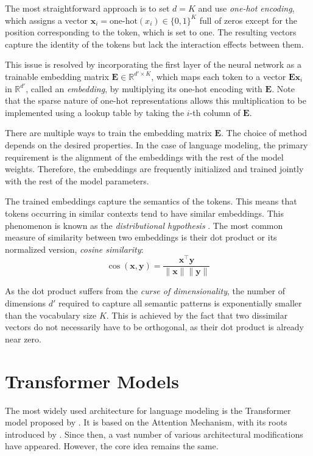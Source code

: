 The most straightforward approach is to set \(d=K\) and use \textit{one-hot encoding}, which assigns a vector \(\mathbf{x}_i = \textrm{one-hot}(x_i) \in \{0, 1\}^K\) full of zeros except for the position corresponding to the token, which is set to one. The resulting vectors capture the identity of the tokens but lack the interaction effects between them.

This issue is resolved by incorporating the first layer of the neural network as a trainable embedding matrix \(\mathbf{E} \in \mathbb{R}^{d' \times K}\), which maps each token to a vector \(\mathbf{Ex}_i\) in \(\mathbb{R}^{d'}\), called an \textit{embedding}, by multiplying its one-hot encoding with \(\mathbf{E}\). Note that the sparse nature of one-hot representations allows this multiplication to be implemented using a lookup table by taking the \(i\)-th column of \(\mathbf{E}\).

There are multiple ways to train the embedding matrix \(\mathbf{E}\). The choice of method depends on the desired properties. In the case of language modeling, the primary requirement is the alignment of the embeddings with the rest of the model weights. Therefore, the embeddings are frequently initialized and trained jointly with the rest of the model parameters.

The trained embeddings capture the semantics of the tokens. This means that tokens occurring in similar contexts tend to have similar embeddings. This phenomenon is known as the \textit{distributional hypothesis} \parencite{harris1954}. The most common measure of similarity between two embeddings is their dot product or its normalized version, \textit{cosine similarity}:
\begin{equation}
    \cos(\mathbf{x}, \mathbf{y}) = \frac{\mathbf{x}^\top \mathbf{y}}{\|\mathbf{x}\| \|\mathbf{y}\|}
\end{equation}  

As the dot product suffers from the \textit{curse of dimensionality}, the number of dimensions \(d'\) required to capture all semantic patterns is exponentially smaller than the vocabulary size \(K\). This is achieved by the fact that two dissimilar vectors do not necessarily have to be orthogonal, as their dot product is already near zero.

\section{Transformer Models}

The most widely used architecture for language modeling is the Transformer model proposed by \citet{vaswani2017}. It is based on the Attention Mechanism, with its roots introduced by \citet{bahdanau2014}. Since then, a vast number of various architectural modifications have appeared. However, the core idea remains the same.

